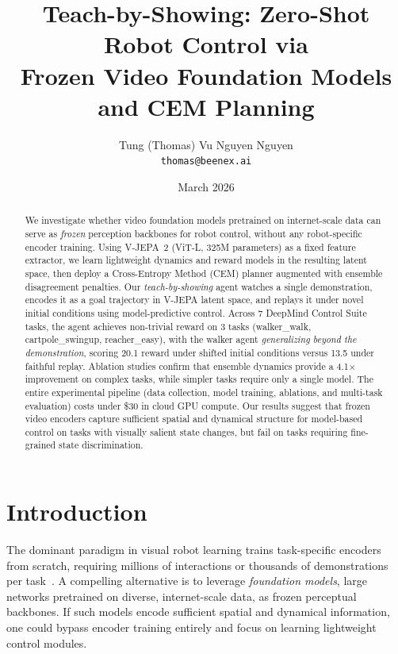 \documentclass{article}
\title{\textbf{Teach-by-Showing: Zero-Shot Robot Control via \\Frozen Video Foundation Models and CEM Planning}}
\author{
Tung (Thomas) Vu Nguyen Nguyen \\
\texttt{thomas@beenex.ai}
}
\date{March 2026}
\begin{document}
\maketitle

\begin{abstract}
We investigate whether video foundation models pretrained on internet-scale data can serve as \emph{frozen} perception backbones for robot control, without any robot-specific encoder training. Using V-JEPA~2 (ViT-L, 325M parameters) as a fixed feature extractor, we learn lightweight dynamics and reward models in the resulting latent space, then deploy a Cross-Entropy Method (CEM) planner augmented with ensemble disagreement penalties. Our \emph{teach-by-showing} agent watches a single demonstration, encodes it as a goal trajectory in V-JEPA latent space, and replays it under novel initial conditions using model-predictive control. Across 7 DeepMind Control Suite tasks, the agent achieves non-trivial reward on 3 tasks (walker\_walk, cartpole\_swingup, reacher\_easy), with the walker agent \emph{generalizing beyond the demonstration}, scoring 20.1 reward under shifted initial conditions versus 13.5 under faithful replay. Ablation studies confirm that ensemble dynamics provide a 4.1$\times$ improvement on complex tasks, while simpler tasks require only a single model. The entire experimental pipeline (data collection, model training, ablations, and multi-task evaluation) costs under \$30 in cloud GPU compute. Our results suggest that frozen video encoders capture sufficient spatial and dynamical structure for model-based control on tasks with visually salient state changes, but fail on tasks requiring fine-grained state discrimination.
\end{abstract}

\section{Introduction}

The dominant paradigm in visual robot learning trains task-specific encoders from scratch, requiring millions of interactions or thousands of demonstrations per task~\citep{hafner2020dreamer, hansen2022td-mpc}. A compelling alternative is to leverage \emph{foundation models}, large networks pretrained on diverse, internet-scale data, as frozen perceptual backbones. If such models encode sufficient spatial and dynamical information, one could bypass encoder training entirely and focus on learning lightweight control modules.
\end{document}
